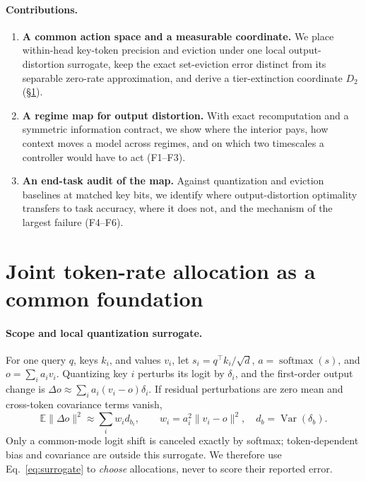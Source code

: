 \documentclass{article}
\theoremstyle{definition}
\begin{document}
\paragraph{Contributions.}
\begin{enumerate}[leftmargin=*,itemsep=1pt,topsep=2pt]
  \item \textbf{A common action space and a measurable coordinate.} We place within-head key-token precision and eviction under one local output-distortion surrogate, keep the exact set-eviction error distinct from its separable zero-rate approximation, and derive a tier-extinction coordinate $D_2$ (\S\ref{sec:framework}).
  \item \textbf{A regime map for output distortion.} With exact recomputation and a symmetric information contract, we show where the interior pays, how context moves a model across regimes, and on which two timescales a controller would have to act (F1--F3).
  \item \textbf{An end-task audit of the map.} Against quantization and eviction baselines at matched key bits, we identify where output-distortion optimality transfers to task accuracy, where it does not, and the mechanism of the largest failure (F4--F6).
\end{enumerate}


\section{Joint token-rate allocation as a common foundation}
\label{sec:framework}

\paragraph{Scope and local quantization surrogate.}
For one query $q$, keys $k_i$, and values $v_i$, let
$s_i=q^\top k_i/\sqrt d$, $a=\operatorname{softmax}(s)$, and
$o=\sum_i a_i v_i$.  Quantizing key $i$ perturbs its logit by $\delta_i$, and the first-order output change is $\Delta o \approx \sum_i a_i(v_i-o)\delta_i$.
If residual perturbations are zero mean and cross-token covariance terms vanish,
\begin{equation}
  \mathbb E\|\Delta o\|^2
  \approx \sum_i w_i d_{b_i}, \qquad
  w_i=a_i^2\|v_i-o\|^2,\quad d_b=\operatorname{Var}(\delta_b).
  \label{eq:surrogate}
\end{equation}
Only a common-mode logit shift is canceled exactly by softmax; token-dependent bias and covariance are outside this surrogate.  We therefore use Eq.~\ref{eq:surrogate} to \emph{choose} allocations, never to score their reported error.
\end{document}
